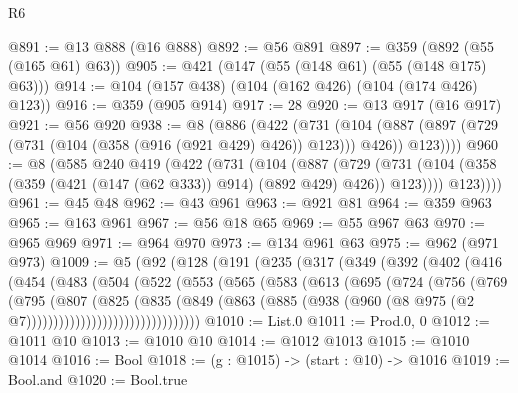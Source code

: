 \begin{lexlean}{R6}
\begin{coremodule}
{{{{{{{{{{{{{{{{{{{{@891 := @13 @888 (@16 @888)
@892 := @56 @891
@897 := @359 (@892 (@55 (@165 @61) @63))
@905 := @421 (@147 (@55 (@148 @61) (@55 (@148 @175) @63)))
@914 := @104 (@157 @438) (@104 (@162 @426) (@104 (@174 @426) @123))
@916 := @359 (@905 @914)
@917 := 28
@920 := @13 @917 (@16 @917)
@921 := @56 @920
@938 := @8
    (@886
      (@422
        (@731
          (@104 (@887 (@897 (@729 (@731 (@104 (@358 (@916 (@921 @429) @426)) @123))) @426)) @123))))
@960 := @8
    (@585
      @240
      @419
      (@422
        (@731
          (@104
            (@887
              (@729
                (@731 (@104 (@358 (@359 (@421 (@147 (@62 @333)) @914) (@892 @429) @426)) @123))))
            @123))))
@961 := @45 @48
@962 := @43 @961
@963 := @921 @81
@964 := @359 @963
@965 := @163 @961
@967 := @56 @18 @65
@969 := @55 @967 @63
@970 := @965 @969
@971 := @964 @970
@973 := @134 @961 @63
@975 := @962 (@971 @973)
@1009 := @5
    (@92
      (@128
        (@191
          (@235
            (@317
              (@349
                (@392
                  (@402
                    (@416
                      (@454
                        (@483
                          (@504
                            (@522
                              (@553
                                (@565
                                  (@583
                                    (@613
                                      (@695
                                        (@724
                                          (@756
                                            (@769
                                              (@795
                                                (@807
                                                  (@825
                                                    (@835
                                                      (@849
                                                        (@863
                                                          (@885
                                                            (@938
                                                              (@960
                                                                (@8
                                                                  @975
                                                                  (@2
                                                                    @7))))))))))))))))))))))))))))))))
@1010 := List.{0}
@1011 := Prod.{0, 0}
@1012 := @1011 @10
@1013 := @1010 @10
@1014 := @1012 @1013
@1015 := @1010 @1014
@1016 := Bool
@1018 := (g : @1015) -> (start : @10) -> @1016
@1019 := Bool.and
@1020 := Bool.true
}}}}}}}}}}}}}}}}}}}}
\end{coremodule}
\end{lexlean}
